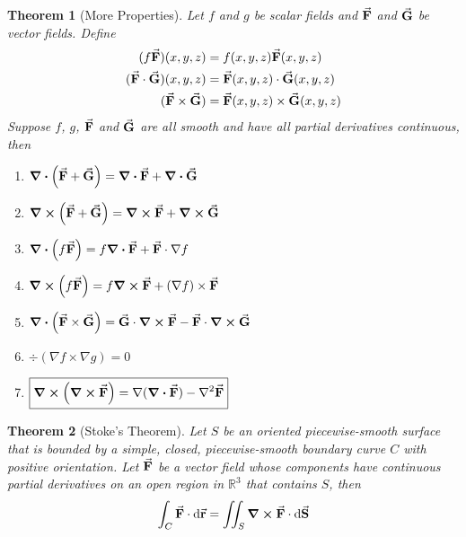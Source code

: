 \documentclass[12pt,a4paper]{article}
\newtheorem{thm}{Theorem}[subsection]
\def\dsst{\displaystyle}
\def\R{{\mathbb{R}}}
\def\d{{\mathrm{d}}}
\def\intC{\dsst\int_C}
\def\vecr{\va{{\textbf{r}}}}
\def\F{\va{\boldsymbol{\textbf{F}}}}
\begin{document}
\begin{thm}[More Properties]
	Let $f$ and $g$ be scalar fields and $\F$ and $\va{G}$ be vector fields. Define \[\begin{aligned}(f\F)(x,y,z)&=f(x,y,z)\F(x,y,z)\\ (\F\cdot\va{G})(x,y,z)&=\F(x,y,z)\cdot\va{G}(x,y,z)\\(\F\times\va{G})&=\F(x,y,z)\times\va{G}(x,y,z)\end{aligned}\]Suppose $f$, $g$, $\F$ and $\va{G}$ are all smooth and have all partial derivatives continuous, then 
	\begin{enumerate}
		\item $\div(\F+\va{G})=\div\F+\div\va{G}$
		\item $\curl(\F+\va{G})=\curl\F+\curl\va{G}$
		\item $\div(f\F)=f\div\F+\F\cdot\nabla f$
		\item $\curl(f\F)=f\curl\F+(\nabla f)\times\F$
		\item $\div(\F\times\va{G})=\va{G}\cdot\curl\F-\F\cdot\curl\va{G}$
		\item $\div(\nabla f\times\nabla g)=0$
		\item $\boxed{\curl(\curl\F)=\nabla(\div\F)-\laplacian\F}$
	\end{enumerate} 
\end{thm}
\begin{thm}[Stoke's Theorem]
	Let $S$ be an oriented piecewise-smooth surface that is bounded by a simple, closed, piecewise-smooth boundary curve $C$ with positive orientation. Let $\F$ be a vector field whose components have continuous partial derivatives on an open region in $\R^3$ that contains $S$, then \[\intC\F\cdot\d\vecr=\iint_{S}\curl\F\cdot\d\va{S}\]
\end{thm}


\label{LastPage}
\end{document}
